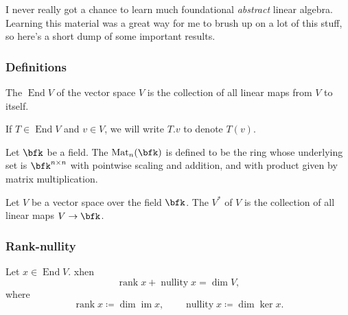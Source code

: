 \documentclass{article}
\DeclareMathOperator{\End}{End}
\DeclareMathOperator{\Mat}{Mat}
\DeclareMathOperator{\im}{im}
\DeclareMathOperator{\rank}{rank}
\DeclareMathOperator{\nullity}{nullity}
\newcommand*\acts{.}
\begin{document}
I never really got a chance to learn much foundational \textit{abstract} linear algebra.
Learning this material was a great way for me to brush up on a lot of this stuff, so here's a short dump of some important results.

\subsubsection{Definitions}

\begin{definition}
    The  $\End V$ of the vector space $V$ is the collection of all linear maps from $V$ to itself.

    If $T \in \End V$ and $v \in V$, we will write $T \acts v$ to denote $T(v)$.
\end{definition}

\begin{definition}
    Let $\bfk$ be a field.
    The  $\Mat_n(\bfk)$ is defined to be the ring whose underlying set is $\bfk^{n \times n}$ with pointwise scaling and addition, and with product given by matrix multiplication.
\end{definition}

\begin{definition}
    Let $V$ be a vector space over the field $\bfk$.
    The  $V^\ast$ of $V$ is the collection of all linear maps $V \to \bfk$.
\end{definition}

\subsubsection{Rank-nullity}

\begin{theorem}
    \label{thm:RankNullity}
    Let $x \in \End V$.
    xhen
    \[
        \rank x + \nullity x
        =
        \dim V,
    \]
    where
    \[
        \rank x
        \coloneq
        \dim \im x
        ,\qquad
        \nullity x
        \coloneq
        \dim \ker x.
    \]
\end{theorem}
\end{document}
